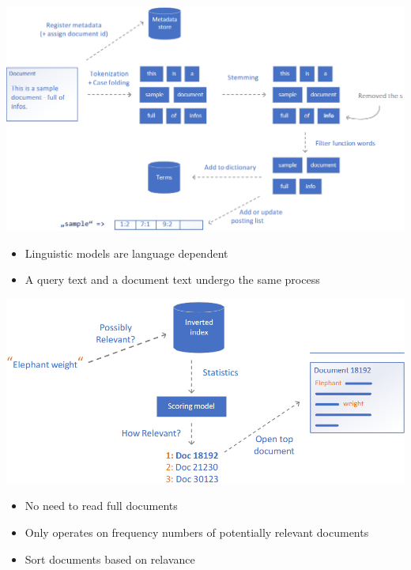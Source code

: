 \documentclass[
../../NLP4W_Summary.tex,
]
{subfiles}
\begin{document}
\begin{minipage}
    [t]{0.63\textwidth}
    \begin{defbox}
        \begin{center}
            \includegraphics[width=\textwidth]{Pics/InvertedIndexCreation.png}
        \end{center}
        
        \begin{itemize}
            \item Linguistic models are language dependent
            \item A query text and a document text undergo the same process
        \end{itemize}
    \end{defbox}
\end{minipage}

\begin{defbox}
    \begin{center}
        \includegraphics[scale=0.4]{Pics/InvertedIndexQuerying.png}
    \end{center}
    \begin{itemize}
        \item No need to read full documents
        \item Only operates on frequency numbers of potentially relevant documents 
        \item Sort documents based on relavance
    \end{itemize}
\end{defbox}
\end{document}
